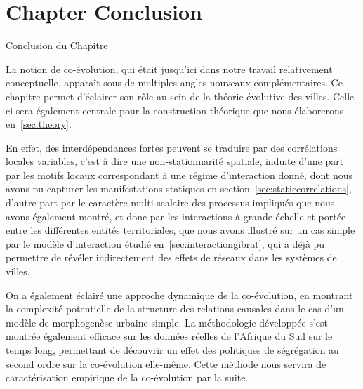 




\newpage


\section*{Chapter Conclusion}{Conclusion du Chapitre}


La notion de co-évolution, qui était jusqu'ici dans notre travail relativement conceptuelle, apparaît sous de multiples angles nouveaux complémentaires. Ce chapitre permet d'éclairer son rôle au sein de la théorie évolutive des villes. Celle-ci sera également centrale pour la construction théorique que nous élaborerons en~\ref{sec:theory}.
 
En effet, des interdépendances fortes peuvent se traduire par des corrélations locales variables, c'est à dire une non-stationnarité spatiale, induite d'une part par les motifs locaux correspondant à une régime d'interaction donné, dont nous avons pu capturer les manifestations statiques en section~\ref{sec:staticcorrelations}, d'autre part par le caractère multi-scalaire des processus impliqués que nous avons également montré, et donc par les interactions à grande échelle et portée entre les différentes entités territoriales, que nous avons illustré sur un cas simple par le modèle d'interaction étudié en~\ref{sec:interactiongibrat}, qui a déjà pu permettre de révéler indirectement des effets de réseaux dans les systèmes de villes. 

On a également éclairé une approche dynamique de la co-évolution, en montrant la complexité potentielle de la structure des relations causales dans le cas d'un modèle de morphogenèse urbaine simple. La méthodologie développée s'est montrée également efficace sur les données réelles de l'Afrique du Sud sur le temps long, permettant de découvrir un effet des politiques de ségrégation au second ordre sur la co-évolution elle-même. Cette méthode nous servira de caractérisation empirique de la co-évolution par la suite.





\stars

